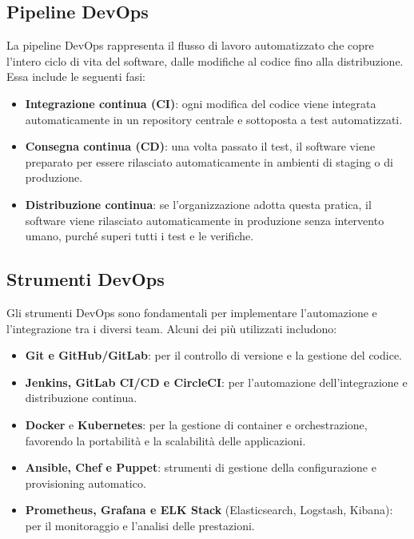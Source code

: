 \documentclass{article}
\begin{document}
\subsection{Pipeline DevOps}
La pipeline DevOps rappresenta il flusso di lavoro automatizzato che copre l'intero ciclo di vita del software, dalle modifiche al codice fino alla distribuzione. Essa include le seguenti fasi:
\begin{itemize}
    \item \textbf{Integrazione continua (CI)}: ogni modifica del codice viene integrata automaticamente in un repository centrale e sottoposta a test automatizzati.
    \item \textbf{Consegna continua (CD)}: una volta passato il test, il software viene preparato per essere rilasciato automaticamente in ambienti di staging o di produzione.
    \item \textbf{Distribuzione continua}: se l'organizzazione adotta questa pratica, il software viene rilasciato automaticamente in produzione senza intervento umano, purché superi tutti i test e le verifiche.
\end{itemize}

\subsection{Strumenti DevOps}
Gli strumenti DevOps sono fondamentali per implementare l'automazione e l'integrazione tra i diversi team. Alcuni dei più utilizzati includono:
\begin{itemize}
    \item \textbf{Git e GitHub/GitLab}: per il controllo di versione e la gestione del codice.
    \item \textbf{Jenkins, GitLab CI/CD e CircleCI}: per l'automazione dell'integrazione e distribuzione continua.
    \item \textbf{Docker} e \textbf{Kubernetes}: per la gestione di container e orchestrazione, favorendo la portabilità e la scalabilità delle applicazioni.
    \item \textbf{Ansible, Chef e Puppet}: strumenti di gestione della configurazione e provisioning automatico.
    \item \textbf{Prometheus, Grafana e ELK Stack} (Elasticsearch, Logstash, Kibana): per il monitoraggio e l'analisi delle prestazioni.
\end{itemize}
\end{document}
